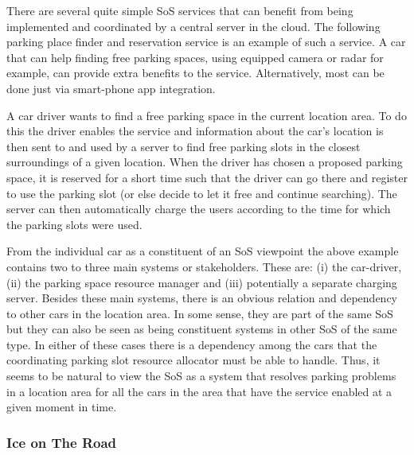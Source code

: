 There are several quite simple SoS services that can benefit from being implemented and coordinated by a central server in the cloud. The following parking place finder and reservation service is an example of such a service. A car that can help finding free parking spaces, using equipped camera or radar for example, can provide extra benefits to the service. Alternatively, most can be done just via smart-phone app integration.

 A car driver wants to find a free parking space in the current location area. To do this the driver enables the service and information about the car's location is then sent to and used by a server to find free parking slots in the closest surroundings of a given location. When the driver has chosen a proposed parking space, it is reserved for a short time such that the driver can go there and register to use the parking slot (or else decide to let it free and continue searching). The server can then automatically charge the users according to the time for which the parking slots were used. %
 
From the individual car as a constituent of an SoS viewpoint the above example contains two to three main systems or stakeholders. These are: (i) the car-driver, (ii) the parking space resource manager and (iii) potentially a separate charging server. Besides these main systems, there is an obvious relation and dependency to other cars in the location area. In some sense, they are part of the same SoS but they can also be seen as being constituent systems in other SoS of the same type. In either of these cases there is a dependency among the cars that the coordinating parking slot resource allocator must be able to handle. Thus, it seems to be natural to view the SoS as a system that resolves parking problems in a location area for all the cars in the area that have the service enabled at a given moment in time.

\subsubsection{Ice on The Road}

